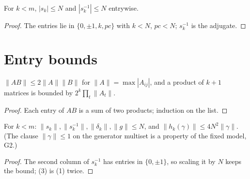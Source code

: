 \begin{lemma}\label{lem:cocycle-bound}
  \leanok
  For $k<m$, $|s_k|\le N$ and $|s_k^{-1}|\le N$ entrywise.
\end{lemma}
\begin{proof}
  \leanok
  The entries lie in $\{0,\pm1,k,pc\}$ with $k<N$, $pc<N$; $s_k^{-1}$ is the adjugate.
\end{proof}

\section{Entry bounds}

\begin{lemma}[Submultiplicativity]\label{lem:bounds}
  \leanok
  $\|AB\|\le2\|A\|\|B\|$ for $\|A\|=\max|A_{ij}|$, and a product of $k+1$ matrices is bounded by $2^{k}\prod_t\|A_t\|$.
\end{lemma}
\begin{proof}
  \leanok
  Each entry of $AB$ is a sum of two products; induction on the list.
\end{proof}

\begin{lemma}\label{lem:bounds-23}
  \leanok
  For $k<m$: $\|s_k\|,\|s_k^{-1}\|,\|\delta_k\|,\|g\|\le N$, and $\|h_k(\gamma)\|\le4N^2\|\gamma\|$. (The clause
  $\|\gamma\|\le1$ on the generator multiset is a property of the fixed model, G2.)
\end{lemma}
\begin{proof}
  \leanok
  The second column of $s_k^{-1}$ has entries in $\{0,\pm1\}$, so scaling it by $N$ keeps the bound; (3) is (1) twice.
\end{proof}

